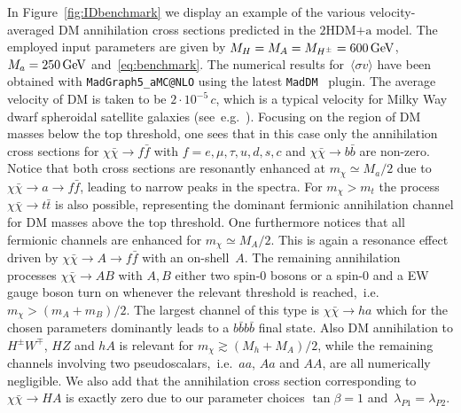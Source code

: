 \documentclass[a4paper, 11pt,notoc]{article}
\newcommand{\hdma}{\ensuremath{\textrm{2HDM+a}}\xspace}
\begin{document}
In Figure~\ref{fig:IDbenchmark} we display  an example of the various velocity-averaged DM annihilation cross sections predicted  in the \hdma model. The employed input parameters are given by $M_H = M_A = M_{H^\pm} = 600 \, {\rm GeV}$, $M_a = 250 \, {\rm GeV}$ and~\eqref{eq:benchmark}. The numerical results for~$\langle \sigma v \rangle$ have been obtained with {\tt MadGraph5\_aMC@NLO}  using the latest  {\tt MadDM}~\cite{Ambrogi:2018jqj} plugin.  The average velocity of DM is taken to be $2 \cdot 10^{-5} \, c$, which is a typical velocity for Milky Way dwarf spheroidal satellite galaxies (see~e.g.~\cite{Simon:2007dq,Walker:2008ax}). Focusing on the region of DM masses below the top threshold, one sees that in this case only the annihilation cross sections for $\chi \bar \chi \to f \bar f$ with $f = e, \mu, \tau, u, d, s, c$ and $\chi \bar \chi \to b \bar b$ are non-zero.   Notice that both cross sections are resonantly enhanced at $m_\chi \simeq M_a/2$ due to $\chi \bar \chi \to a \to f \bar f$, leading to narrow peaks in the spectra. For $m_\chi > m_t$ the process $\chi \bar \chi \to t \bar t$ is also possible, representing the dominant fermionic annihilation channel for DM masses above the top threshold. One furthermore notices that all fermionic channels are enhanced for $m_\chi \simeq M_A/2$. This is again a resonance effect driven  by $\chi \bar \chi \to A \to f \bar f$ with an on-shell~$A$. The remaining annihilation processes $\chi \bar \chi \to A B$ with $A,B$ either  two spin-0 bosons or a spin-0 and a EW gauge boson turn on whenever the relevant threshold is reached,~i.e.~$m_\chi > (m_A + m_B)/2$. The largest channel of this type is $\chi \bar \chi \to ha$ which for the chosen parameters dominantly leads to a $b \bar b b \bar b$ final state. Also DM annihilation to  $H^\pm W^\mp$, $HZ$ and $hA$ is relevant for $m_\chi \gtrsim (M_h + M_A)/2$, while the remaining channels involving two pseudoscalars,~i.e.~$aa$, $Aa$ and $AA$, are all numerically negligible. We also add that the annihilation cross section corresponding to $\chi \bar \chi \to HA$ is exactly zero due to our parameter choices  $\tan \beta = 1$ and~$\lambda_{P1} = \lambda_{P2}$.  
\end{document}
